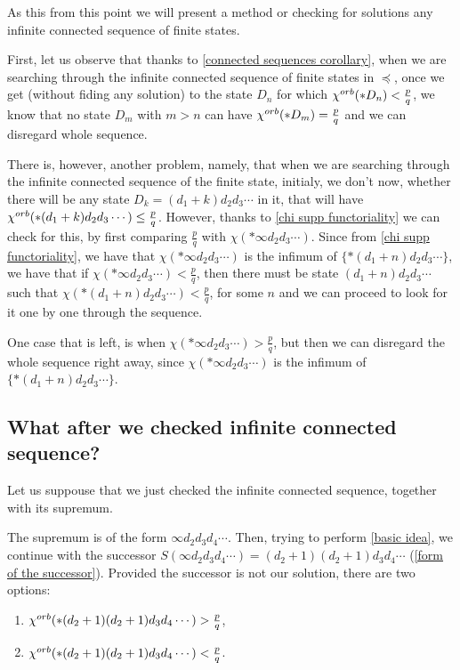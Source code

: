 As this from this point we will present a method or checking for solutions any 
infinite connected sequence of finite states.

First, let us observe that thanks to \ref{connected sequences corollary}, 
when we are searching through the infinite connected sequence of finite states in 
$\preceq$, once we get (without fiding any solution) 
to the state $D_n$ for which ${\chi^{orb}(*D_n)} < \frac{p}{q}$, we know 
that no state $D_m$ with $m>n$ can have ${\chi^{orb}(*D_m)} = \frac{p}{q}$ 
and we can disregard whole sequence. 

There is, however, another problem, namely, that when we are searching through 
the infinite connected sequence of the finite state, 
initialy, we don't now, whether there will be any state 
$D_k = (d_1+k)d_2d_3\cdots$ in it, that 
will have ${\chi^{orb}(*(d_1+k)d_2d_3\cdots)} \leq \frac{p}{q}$. 
However, thanks to \ref{chi supp functoriality} 
we can check for this, by first comparing $\frac{p}{q}$ with $\chi(*\infty d_2d_3\cdots)$. 
Since from \ref{chi supp functoriality}, we have that 
$\chi(*\infty d_2d_3\cdots)$ is the infimum of $\{*(d_1+n)d_2d_3\cdots\}$, 
we have that if $\chi(*\infty d_2d_3\cdots) < \frac{p}{q}$, then
there must be state $(d_1+n)d_2d_3\cdots$ such that $\chi(*(d_1+n)d_2d_3\cdots) < \frac{p}{q}$, 
for some $n$ and we can proceed to look for it one by one through the sequence.

One case that is left, is when $\chi(*\infty d_2d_3\cdots) > \frac{p}{q}$, but then we can 
disregard the whole sequence right away, since 
$\chi(*\infty d_2d_3\cdots)$ is the infimum of $\{*(d_1+n)d_2d_3\cdots\}$.

\subsection{What after we checked infinite connected sequence?}
Let us suppouse that we just checked the infinite connected sequence, together with its supremum. 


The supremum is of the form $\infty d_2 d_3d_4\cdots$.
Then, trying to perform \ref{basic idea}, 
we continue with the successor $S(\infty d_2 d_3d_4\cdots) = (d_2+1)(d_2+1)d_3d_4\cdots$ 
(\ref{form of the successor}). Provided the successor is not our solution, 
there are two options:
\begin{enumerate} 
\item ${\chi^{orb}(*(d_2+1)(d_2+1)d_3d_4\cdots)} > \frac{p}{q}$,
\item ${\chi^{orb}(*(d_2+1)(d_2+1)d_3d_4\cdots)} < \frac{p}{q}$.
\end{enumerate} 

